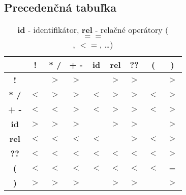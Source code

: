 \documentclass[a4paper,11pt]{article}
\begin{document}
\subsection{Precedenčná tabuľka}
\begin{table}[htbp]
    \centering
    \begin{tabular}{|c||*{8}{c|}}
        \hline
        \textbf{} & \textbf{!} & \textbf{* /} & \textbf{+ -} & \textbf{id} & \textbf{rel} & \textbf{??} & \textbf{(} & \textbf{)} \\
        \hline\hline
        \textbf{!} & & $>$ & $>$ & & $>$ & $>$ &  & $>$ \\
        \hline
        \textbf{* /} & $<$ & $>$ & $>$ & $<$ & $>$ & $>$ & $<$ & $>$ \\
        \hline
        \textbf{+ -} & $<$ & $<$ & $>$ & $<$ & $>$ & $>$ & $<$ & $>$ \\
        \hline
        \textbf{id} & $>$ & $>$ & $>$ & & $>$ & $>$ & & $>$ \\
        \hline
        \textbf{rel} & $<$ & $<$ & $<$ & $<$ &  & $>$ & $<$ & $>$ \\
        \hline
        \textbf{??} & $<$ & $<$ & $<$ & $<$ & $<$ & $<$ & $<$ & $>$ \\
        \hline
        \textbf{(} & $<$ & $<$ & $<$ & $<$ & $<$ & $<$ & $<$ & = \\
        \hline
        \textbf{)} & $>$ & $>$ & $>$ &  & $>$ & $>$ &  & $>$ \\
        \hline
    \end{tabular}
    \caption{\textbf{id} - identifikátor, \textbf{rel} - relačné operátory ($$==$$, $<$$=$, \dots)}
\end{table}
\end{document}
